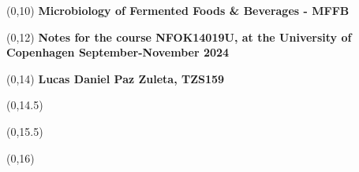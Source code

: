 \begin{titlepage}


\begin{textblock}{9.4}(0,10)
    \Huge{\sffamily\bfseries{Microbiology of Fermented Foods \& Beverages - MFFB}}
\end{textblock}

\begin{textblock}{9.4}(0,12)
    \LARGE{\sffamily\bfseries{Notes for the course NFOK14019U, at the University of Copenhagen September-November 2024}}
\end{textblock}

\begin{textblock}{9.4}(0,14)
    \large{\sffamily\bfseries{Lucas Daniel Paz Zuleta, TZS159}}
\end{textblock}

\begin{textblock}{9.4}(0,14.5)
    \large{}
\end{textblock}

\begin{textblock}{9.4}(0,15.5)
    \large{}
\end{textblock}

\begin{textblock}{8.4}(0,16)
    \large{}
\end{textblock}

\end{titlepage}